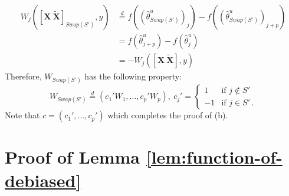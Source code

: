 \documentclass[11pt]{article}
\newcommand{\bX}{\boldsymbol{X}}
\newcommand{\bXT}{\widetilde{\bX} }
\newcommand{\hth}{\widehat{\theta}}
\begin{document}
\begin{align*}
    W_j([\bX\ \bXT]_{Swap(S')},y) &\stackrel{d}{=}  f\left(\left(\hth^u_{Swap(S')}\right)_{j}\right) - f\left(\left(\hth^u_{Swap(S')}\right)_{j+p}\right)\\
    &= f\left(\hth^u_{j+p}\right) - f\left(\hth^u_{j}\right)\\
    &= -W_j([\bX\ \bXT],y)
\end{align*}
Therefore, $W_{Swap(S')}$ has the following property:
\[
W_{Swap(S')}\stackrel{d}{=}(c_1'W_1,\dotsc,c_p'W_p),\ c_j'=\begin{cases}
    1 & \mbox{if }j\notin S'\\
    -1 & \mbox{if }j\in S'\,.
\end{cases}
\]
Note that $c=(c_1',\dotsc,c_p')$ which completes the proof of (b).
\section{Proof of Lemma \ref{lem:function-of-debiased}}\label{pf:function-of-debiased}
\end{document}
